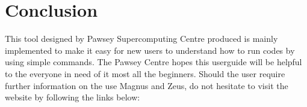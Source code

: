 \documentclass[journal,a4paper,pdftex]{IEEEtran}
\begin{document}
%






\section{Conclusion}

This tool designed by Pawsey Supercomputing Centre produced is mainly implemented to make it easy for new users to understand how to run codes by using simple commands. 
The Pawsey Centre hopes this userguide will be helpful to the everyone in need of it most all the beginners.
Should the user require further information on the use Magnus and Zeus, do not hesitate to visit the website by following the links below:
\end{document}
